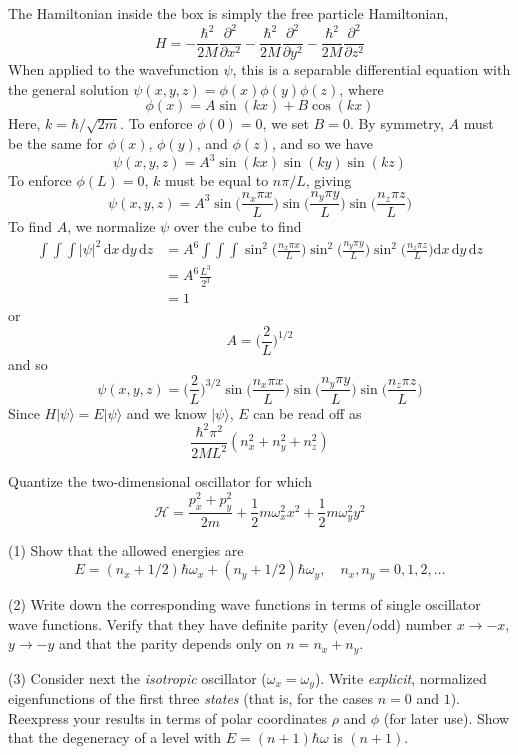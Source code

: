 \documentclass[../principles-of-quantum-mechanics.tex]{subfiles}
\begin{document}
\begin{questions}
		\begin{solution}
			The Hamiltonian inside the box is simply the free particle Hamiltonian,
			$$H = -\frac{\hbar^2}{2M}\frac{\partial^2}{\partial x^2} - \frac{\hbar^2}{2M}\frac{\partial^2}{\partial y^2} - \frac{\hbar^2}{2M}\frac{\partial^2}{\partial z^2}$$
			When applied to the wavefunction $\psi$, this is a separable differential equation with the general solution $\psi(x, y, z) = \phi(x)\phi(y)\phi(z)$, where
			$$\phi(x) = A\sin(kx) + B\cos(kx)$$
			Here, $k = \hbar/\sqrt{2m}$. To enforce $\phi(0) = 0$, we set $B = 0$. By symmetry, $A$ must be the same for $\phi(x)$, $\phi(y)$, and $\phi(z)$, and so we have
			$$\psi(x, y, z) = A^3\sin(kx)\sin(ky)\sin(kz)$$
			To enforce $\phi(L) = 0$, $k$ must be equal to $n\pi/L$, giving
			$$\psi(x, y, z) = A^3\sin\Big(\frac{n_x\pi x}{L}\Big)\sin\Big(\frac{n_y\pi y}{L}\Big)\sin\Big(\frac{n_z\pi z}{L}\Big)$$
			To find $A$, we normalize $\psi$ over the cube to find
			\begin{align*}
				\int\!\!\!\!\int\!\!\!\!\int|\psi|^2\,\mathrm{d}x\,\mathrm{d}y\,\mathrm{d}z &= A^6 \int\!\!\!\!\int\!\!\!\!\int\sin^2\Big(\frac{n_x\pi x}{L}\Big)\sin^2\Big(\frac{n_y\pi y}{L}\Big)\sin^2\Big(\frac{n_z\pi z}{L}\Big)\mathrm{d}x\,\mathrm{d}y\,\mathrm{d}z \\
				&= A^6\frac{L^3}{2^3} \\
				&= 1
			\end{align*}
			or
			$$A = \Big(\frac{2}{L}\Big)^{1/2}$$
			and so
			$$\psi(x, y, z) = \Big(\frac{2}{L}\Big)^{3/2}\sin\Big(\frac{n_x\pi x}{L}\Big)\sin\Big(\frac{n_y\pi y}{L}\Big)\sin\Big(\frac{n_z\pi z}{L}\Big)$$
			Since $H|\psi\rangle = E|\psi\rangle$ and we know $|\psi\rangle$, $E$ can be read off as
			$$\frac{\hbar^2\pi^2}{2ML^2}(n_x^2 + n_y^2 + n_z^2)$$
		\end{solution}
		
		\question Quantize the two-dimensional oscillator for which
		$$\mathcal{H} = \frac{p_x^2 + p_y^2}{2m} + \frac{1}{2}m\omega_x^2x^2 + \frac{1}{2}m\omega_y^2y^2$$
		
		(1) Show that the allowed energies are
		$$E = (n_x + 1/2)\hbar\omega_x + (n_y + 1/2)\hbar\omega_y, \quad n_x, n_y = 0, 1, 2, \dots$$
		
		(2) Write down the corresponding wave functions in terms of single oscillator wave functions. Verify that they have definite parity (even/odd) number $x\to{-x}$, $y\to{-y}$ and that the parity depends only on $n = n_x + n_y$.
		
		(3) Consider next the \textit{isotropic} oscillator ($\omega_x = \omega_y$). Write \textit{explicit}, normalized eigenfunctions of the first three \textit{states} (that is, for the cases $n = 0$ and $1$). Reexpress your results in terms of polar coordinates $\rho$ and $\phi$ (for later use). Show that the degeneracy of a level with $E = (n + 1)\hbar\omega$ is $(n + 1)$.
		

\end{questions}
\end{document}
